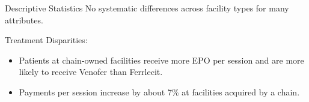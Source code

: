 \begin{frame}{Descriptive Statistics}
No systematic differences across facility types for many attributes.

    Treatment Disparities:
    \begin{itemize}
        \item Patients at chain-owned facilities receive more EPO per session and are more likely to receive Venofer than Ferrlecit.
        \item  Payments per session increase by about 7\% at facilities acquired by a chain.
    \end{itemize}
    
       
\end{frame}